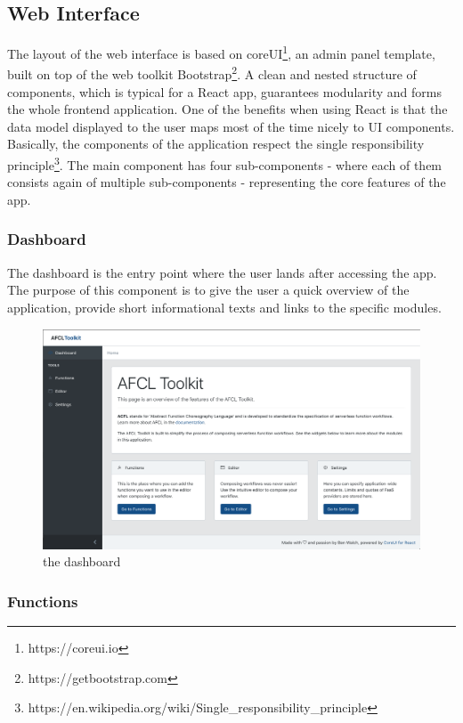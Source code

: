 \documentclass[a4paper,11pt,pdftex,halfparskip,cleardoubleempty,bibtotoc,liststotoc]{scrbook}
\begin{document}
\subsection{Web Interface}

The layout of the web interface is based on coreUI\footnote{https://coreui.io}, an admin panel template, built on top of the web toolkit Bootstrap\footnote{https://getbootstrap.com}. A clean and nested structure of components, which is typical for a React app, guarantees modularity and forms the whole frontend application. One of the benefits when using React is that the data model displayed to the user maps most of the time nicely to UI components. Basically, the components of the application respect the single responsibility principle\footnote{https://en.wikipedia.org/wiki/Single\_responsibility\_principle}. The main component has four sub-components - where each of them consists again of multiple sub-components - representing the core features of the app.

\subsubsection{Dashboard}

The dashboard is the entry point where the user lands after accessing the app. The purpose of this component is to give the user a quick overview of the application, provide short informational texts and links to the specific modules. 

\begin{figure}[H]
  \centering
  \includegraphics[width=\textwidth]{dashboard}
  \caption{the dashboard}
\end{figure}

\subsubsection{Functions}
\end{document}
